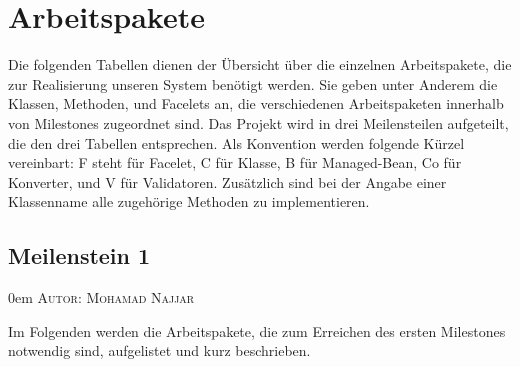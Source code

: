 \documentclass{article}
\makeatletter
\newcommand{\sectionauthor}[1]{
	{\parindent 0em \large \scshape Autor: #1 \par \nobreak \vspace*{1em}}
	\@afterheading
}
\makeatother
\begin{document}
\section{Arbeitspakete}

Die folgenden Tabellen dienen der Übersicht über die einzelnen Arbeitspakete, die zur Realisierung unseren System benötigt werden.
Sie geben unter Anderem die Klassen, Methoden, und Facelets an, die verschiedenen Arbeitspaketen innerhalb von Milestones zugeordnet sind. 
Das Projekt wird in drei Meilensteilen aufgeteilt, die den drei Tabellen entsprechen.
Als Konvention werden folgende Kürzel vereinbart: F steht für Facelet, C für Klasse, B für Managed-Bean, Co für Konverter, und V für Validatoren.
Zusätzlich sind bei der Angabe einer Klassenname alle zugehörige Methoden zu implementieren. 


\subsection{Meilenstein 1}
\sectionauthor{Mohamad Najjar}

Im Folgenden werden die Arbeitspakete, die zum Erreichen des ersten Milestones notwendig sind, aufgelistet und kurz beschrieben. 
\end{document}
